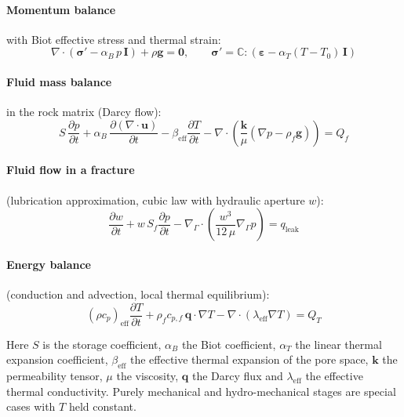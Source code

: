 \documentclass[11pt,a4paper]{article}
\begin{document}
\paragraph{Momentum balance} with Biot effective stress and thermal strain:
\begin{equation}
  \nabla \cdot \left( \bm{\sigma}' - \alpha_B \, p \, \mathbf{I} \right) + \rho \mathbf{g} = \mathbf{0},
  \qquad
  \bm{\sigma}' = \mathbb{C} : \left( \bm{\varepsilon} - \alpha_T (T - T_0)\, \mathbf{I} \right)
\end{equation}

\paragraph{Fluid mass balance} in the rock matrix (Darcy flow):
\begin{equation}
  S \, \frac{\partial p}{\partial t}
  + \alpha_B \, \frac{\partial (\nabla\cdot\mathbf{u})}{\partial t}
  - \beta_{\mathrm{eff}} \frac{\partial T}{\partial t}
  - \nabla \cdot \left( \frac{\mathbf{k}}{\mu} \left( \nabla p - \rho_f \mathbf{g} \right) \right) = Q_f
\end{equation}

\paragraph{Fluid flow in a fracture} (lubrication approximation, cubic law with
hydraulic aperture $w$):
\begin{equation}
  \frac{\partial w}{\partial t} + w\, S_f \frac{\partial p}{\partial t}
  - \nabla_{\Gamma} \cdot \left( \frac{w^3}{12\,\mu} \nabla_{\Gamma} p \right) = q_{\mathrm{leak}}
\end{equation}

\paragraph{Energy balance} (conduction and advection, local thermal equilibrium):
\begin{equation}
  (\rho c_p)_{\mathrm{eff}} \frac{\partial T}{\partial t}
  + \rho_f c_{p,f} \, \mathbf{q} \cdot \nabla T
  - \nabla \cdot \left( \lambda_{\mathrm{eff}} \nabla T \right) = Q_T
\end{equation}

Here $S$ is the storage coefficient, $\alpha_B$ the Biot coefficient, $\alpha_T$
the linear thermal expansion coefficient, $\beta_{\mathrm{eff}}$ the effective
thermal expansion of the pore space, $\mathbf{k}$ the permeability tensor, $\mu$
the viscosity, $\mathbf{q}$ the Darcy flux and $\lambda_{\mathrm{eff}}$ the
effective thermal conductivity. Purely mechanical and hydro-mechanical stages
are special cases with $T$ held constant.
\end{document}
